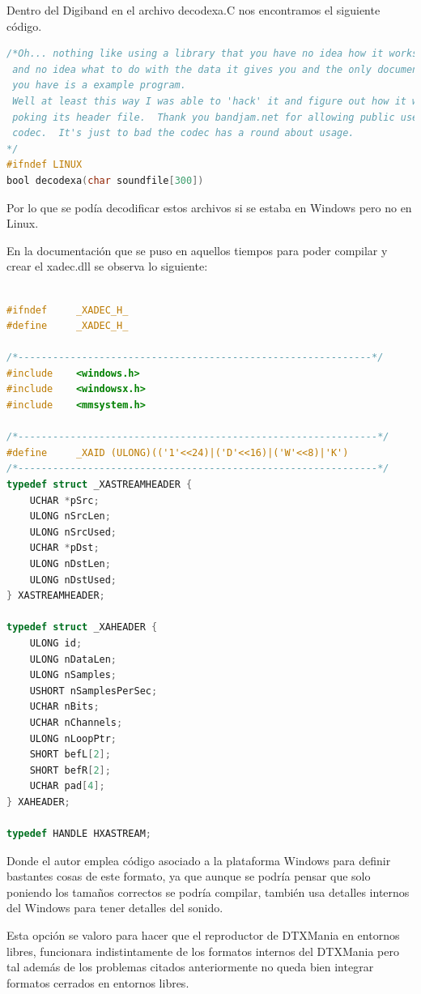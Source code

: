 \documentclass[a4paper,11pt,oneside]{book}
\begin{document}
Dentro del Digiband en el archivo decodexa.C nos encontramos el siguiente código.
\begin{lstlisting}[language=C, frame=single]  
/*Oh... nothing like using a library that you have no idea how it works
 and no idea what to do with the data it gives you and the only documentation 
 you have is a example program.
 Well at least this way I was able to 'hack' it and figure out how it works by
 poking its header file.  Thank you bandjam.net for allowing public use of the 
 codec.  It's just to bad the codec has a round about usage.
*/
#ifndef LINUX
bool decodexa(char soundfile[300])
\end{lstlisting}

Por lo que se podía decodificar estos archivos si se estaba en Windows pero no en Linux.

En la documentación que se puso en aquellos tiempos para poder compilar y crear el xadec.dll se observa lo siguiente:

\begin{lstlisting}[language=C, frame=single]  

#ifndef		_XADEC_H_
#define		_XADEC_H_

/*-------------------------------------------------------------*/
#include	<windows.h>
#include	<windowsx.h>
#include	<mmsystem.h>

/*--------------------------------------------------------------*/
#define		_XAID (ULONG)(('1'<<24)|('D'<<16)|('W'<<8)|'K')
/*--------------------------------------------------------------*/
typedef struct _XASTREAMHEADER {
	UCHAR *pSrc;
	ULONG nSrcLen;
	ULONG nSrcUsed;
	UCHAR *pDst;
	ULONG nDstLen;
	ULONG nDstUsed;
} XASTREAMHEADER;

typedef struct _XAHEADER {
	ULONG id;
	ULONG nDataLen;
	ULONG nSamples;
	USHORT nSamplesPerSec;
	UCHAR nBits;
	UCHAR nChannels;
	ULONG nLoopPtr;
	SHORT befL[2];
	SHORT befR[2];
	UCHAR pad[4];
} XAHEADER;

typedef HANDLE HXASTREAM;
\end{lstlisting}

Donde el autor emplea código asociado a la plataforma Windows para definir bastantes cosas de este formato, ya que aunque se podría pensar que solo poniendo los tamaños correctos se podría compilar, también usa detalles internos del Windows para tener detalles del sonido.

Esta opción se valoro para hacer que el reproductor de DTXMania en entornos libres, funcionara indistintamente de los formatos internos del DTXMania pero tal además de los problemas citados anteriormente no queda bien integrar formatos cerrados en entornos libres.
\end{document}
